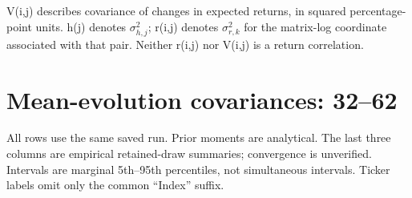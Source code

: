 \documentclass[10pt,a4paper]{article}
\begin{document}
\par\medskip\footnotesize
V(i,j) describes covariance of changes in expected returns, in squared percentage-point units.
h(j) denotes $\sigma_{h,j}^{2}$; r(i,j) denotes $\sigma_{r,k}^{2}$ for the matrix-log coordinate
associated with that pair. Neither r(i,j) nor V(i,j) is a return correlation.

\clearpage\section*{Mean-evolution covariances: 32--62}

\small All rows use the same saved run. Prior moments are analytical.
The last three columns are empirical retained-draw summaries; convergence is unverified.
Intervals are marginal 5th--95th percentiles, not simultaneous intervals.
Ticker labels omit only the common ``Index'' suffix.
\par\medskip
\begingroup\fontsize{7.8}{10.5}\selectfont\setlength{\tabcolsep}{3pt}
\renewcommand{\arraystretch}{1.45}
\end{document}
